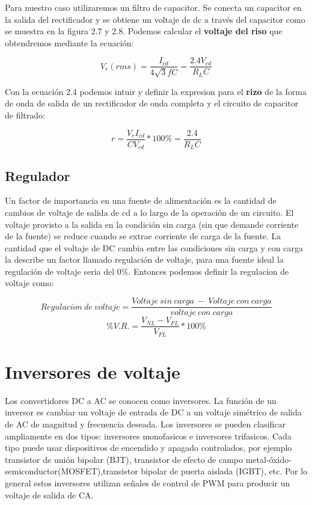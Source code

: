 Para nuestro caso utilizaremos un filtro de capacitor. Se conecta un capacitor en la salida del rectificador y se obtiene un voltaje de dc a través del capacitor como se muestra en la figura 2.7 y 2.8. Podemos calcular el \textbf{voltaje del riso} que obtendremos mediante la ecuación:

\begin{equation}
V_{r}(rms)=\dfrac{I_{cd}}{4\sqrt{3}fC}=\dfrac{2.4V_{cd}}{R_{L}C}
\end{equation}

Con la ecuación 2.4 podemos intuir y definir la expresion para el \textbf{rizo} de la forma de onda de salida de un rectificador de onda completa y el circuito de capacitor de filtrado:

\begin{equation}
r=\dfrac{V_{r}I_{cd}}{CV_{cd}}*100\%=\dfrac{2.4}{R_{L}C}
\end{equation}
\subsection{Regulador}

Un factor de importancia en una fuente de alimentación es la cantidad de cambios de voltaje de salida de cd a lo largo de la operación de un circuito. El voltaje provisto a la salida en la condición sin carga (sin que demande corriente de la fuente) se reduce cuando se extrae corriente de carga de la fuente. La cantidad que el voltaje de DC cambia entre las condiciones sin carga y con carga la describe un factor llamado regulación de voltaje, para una fuente ideal la regulación de voltaje seria del 0\%. Entonces podemos definir la regulacion de voltaje como:
 

$$Regulaci\acute{o}n\:de\: voltaje = \dfrac{Voltaje\: sin \:carga \:-\: Voltaje\: con\: carga}{voltaje\: con\: carga}$$
\begin{equation} 
 \%V.R. = \dfrac{V_{NL}-V_{FL}}{V_{FL}}*100\%
\end{equation}





\newpage

\section{Inversores de voltaje}

Los convertidores DC a AC se conocen como inversores. La función de un inversor es cambiar un voltaje de entrada de DC a un voltaje simétrico de salida de AC de magnitud y frecuencia deseada. 
Los inversores se pueden clasificar ampliamente en dos tipos: inversores monofasicos e inversores trifasicos. Cada tipo puede usar dispositivos de encendido y apagado controlados, por ejemplo transistor de unión bipolar (BJT), transistor de efecto de campo metal-óxido-semiconductor(MOSFET),transistor bipolar de puerta aislada (IGBT), etc. Por lo general estos inversores utilizan señales de control de PWM para producir un voltaje de salida de CA.

